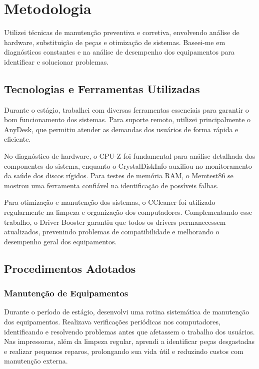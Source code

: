 \chapter{Metodologia}

Utilizei técnicas de manutenção preventiva e corretiva, envolvendo análise de hardware, substituição de peças e otimização de sistemas. Baseei-me em diagnósticos constantes e na análise de desempenho dos equipamentos para identificar e solucionar problemas.

\section{Tecnologias e Ferramentas Utilizadas}

Durante o estágio, trabalhei com diversas ferramentas essenciais para garantir o bom funcionamento dos sistemas. Para suporte remoto, utilizei principalmente o AnyDesk, que permitiu atender as demandas dos usuários de forma rápida e eficiente. 

No diagnóstico de hardware, o CPU-Z foi fundamental para análise detalhada dos componentes do sistema, enquanto o CrystalDiskInfo auxiliou no monitoramento da saúde dos discos rígidos. Para testes de memória RAM, o Memtest86 se mostrou uma ferramenta confiável na identificação de possíveis falhas.

Para otimização e manutenção dos sistemas, o CCleaner foi utilizado regularmente na limpeza e organização dos computadores. Complementando esse trabalho, o Driver Booster garantiu que todos os drivers permanecessem atualizados, prevenindo problemas de compatibilidade e melhorando o desempenho geral dos equipamentos.

\section{Procedimentos Adotados}

\subsection{Manutenção de Equipamentos}

Durante o período de estágio, desenvolvi uma rotina sistemática de manutenção dos equipamentos. Realizava verificações periódicas nos computadores, identificando e resolvendo problemas antes que afetassem o trabalho dos usuários. Nas impressoras, além da limpeza regular, aprendi a identificar peças desgastadas e realizar pequenos reparos, prolongando sua vida útil e reduzindo custos com manutenção externa.

